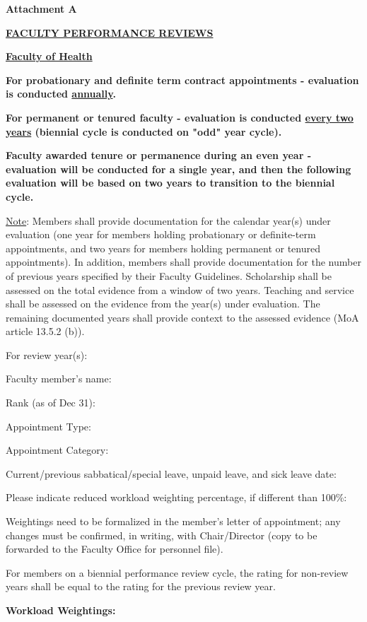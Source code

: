 \documentclass[12pt,letterpaper]{article}
\newcommand{\APRField}[2]{#1 #2\par}
\newcommand{\APRSpacer}{\vspace{0.45em}}
\begin{document}
\begin{center}
\textbf{Attachment A}

\underline{\textbf{FACULTY PERFORMANCE REVIEWS}}

\underline{\textbf{Faculty of Health}}
\end{center}

\textbf{For probationary and definite term contract appointments - evaluation is conducted \underline{annually}.}

\textbf{For permanent or tenured faculty - evaluation is conducted \underline{every two years} (biennial cycle is conducted on "odd" year cycle).}

\textbf{Faculty awarded tenure or permanence during an even year - evaluation will be conducted for a single year, and then the following evaluation will be based on two years to transition to the biennial cycle.}

\underline{Note}: Members shall provide documentation for the calendar year(s) under evaluation (one year for members holding probationary or definite-term appointments, and two years for members holding permanent or tenured appointments). In addition, members shall provide documentation for the number of previous years specified by their Faculty Guidelines. Scholarship shall be assessed on the total evidence from a window of two years. Teaching and service shall be assessed on the evidence from the year(s) under evaluation. The remaining documented years shall provide context to the assessed evidence (MoA article 13.5.2 (b)).

\APRField{For review year(s):}{\APRReviewYears}
\APRField{Faculty member's name:}{\APRFacultyName}
\APRField{Rank (as of Dec 31):}{\APRRank}
\APRField{Appointment Type:}{\APRAppointmentType}
\APRField{Appointment Category:}{\APRAppointmentCategory}
\APRField{Current/previous sabbatical/special leave, unpaid leave, and sick leave date:}{\APRLeaveDates}
\APRField{Please indicate reduced workload weighting percentage, if different than 100\%:}{\APRReducedWorkload}

Weightings need to be formalized in the member's letter of appointment; any changes must be confirmed, in writing, with Chair/Director (copy to be forwarded to the Faculty Office for personnel file).

For members on a biennial performance review cycle, the rating for non-review years shall be equal to the rating for the previous review year.

\APRSpacer
\textbf{Workload Weightings:}
\end{document}
